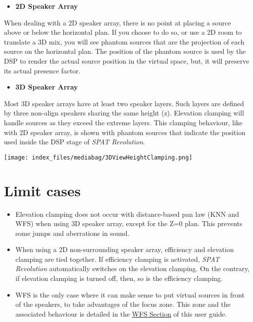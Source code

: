 \documentclass[
  letterpaper,
  DIV=11,
  numbers=noendperiod]{scrreport}
\providecommand{\tightlist}{%
  \setlength{\itemsep}{0pt}\setlength{\parskip}{0pt}}\usepackage{longtable,booktabs,array}
\begin{document}
\begin{itemize}
\tightlist
\item
  \textbf{2D Speaker Array}
\end{itemize}

When dealing with a 2D speaker array, there is no point at placing a
source above or below the horizontal plan. If you choose to do so, or
use a 2D room to translate a 3D mix, you will see phantom sources that
are the projection of each source on the horizontal plan. The position
of the phantom source is used by the DSP to render the actual source
position in the virtual space, but, it will preserve its actual presence
factor.

\begin{itemize}
\tightlist
\item
  \textbf{3D Speaker Array}
\end{itemize}

Most 3D speaker arrays have at least two speaker layers. Such layers are
defined by three non-align speakers sharing the same height (z).
Elevation clamping will handle sources as they exceed the extreme
layers. This clamping behaviour, like with 2D speaker array, is shown
with phantom sources that indicate the position used inside the DSP
stage of \emph{SPAT Revolution}.

\texttt{[image: index\_files/mediabag/3DViewHeightClamping.png]}

\hypertarget{limit-cases}{%
\section{Limit cases}\label{limit-cases}}

\begin{itemize}
\tightlist
\item
  Elevation clamping does not occur with distance-based pan law (KNN and
  WFS) when using 3D speaker array, except for the Z=0 plan. This
  prevents some jumps and aberrations in sound.
\item
  When using a 2D non-surrounding speaker array, efficiency and
  elevation clamping are tied together. If efficiency clamping is
  activated, \emph{SPAT Revolution} automatically switches on the
  elevation clamping. On the contrary, if elevation clamping is turned
  off, then, so is the efficiency clamping.
\item
  WFS is the only case where it can make sense to put virtual sources in
  front of the speakers, to take advantages of the focus zone. This zone
  and the associated behaviour is detailed in the
  \href{Spatialisation_Technology_WFS.md}{WFS Section} of this user
  guide.
\end{itemize}
\end{document}
